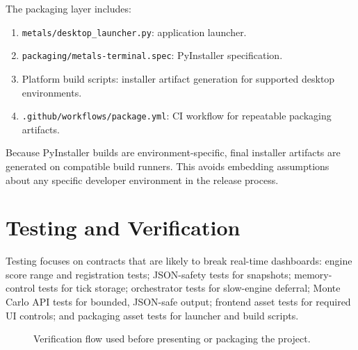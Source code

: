 \documentclass[conference]{IEEEtran}
\begin{document}
The packaging layer includes:
\begin{enumerate}
  \item \texttt{metals/desktop\_launcher.py}: application launcher.
  \item \texttt{packaging/metals-terminal.spec}: PyInstaller specification.
  \item Platform build scripts: installer artifact generation for supported
  desktop environments.
  \item \texttt{.github/workflows/package.yml}: CI workflow for repeatable
  packaging artifacts.
\end{enumerate}

Because PyInstaller builds are environment-specific, final installer
artifacts are generated on compatible build runners. This avoids embedding
assumptions about any specific developer environment in the release process.

\section{Testing and Verification}

Testing focuses on contracts that are likely to break real-time dashboards:
engine score range and registration tests; JSON-safety tests for snapshots;
memory-control tests for tick storage; orchestrator tests for slow-engine
deferral; Monte Carlo API tests for bounded, JSON-safe output; frontend asset
tests for required UI controls; and packaging asset tests for launcher and
build scripts.

\begin{figure}[!t]
\centering
{}
\caption{Verification flow used before presenting or packaging the project.}
\label{fig:verification-flow}
\end{figure}
\end{document}
